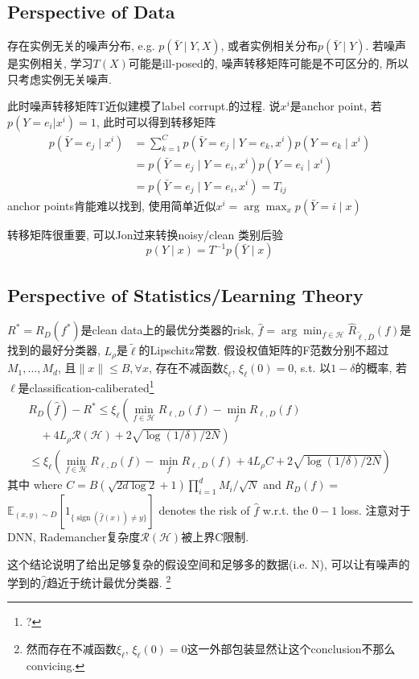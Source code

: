 \documentclass{article}
\begin{document}
\subsection{Perspective of Data}
存在实例无关的噪声分布, e.g. $p(\bar Y \mid Y, X)$, 或者实例相关分布$p(\bar Y \mid Y)$. 若噪声是实例相关, 学习$T(X)$可能是ill-posed的, 噪声转移矩阵可能是不可区分的, 所以只考虑实例无关噪声.

此时噪声转移矩阵T近似建模了label corrupt.的过程. 说$x^i$是anchor point, 若$p(Y=e_i|x^i)=1$, 此时可以得到转移矩阵
\begin{equation}
    \begin{aligned}
    p\left(\bar{Y}=e_{j} \mid x^{i}\right) &=\sum_{k=1}^{C} p\left(\bar{Y}=e_{j} \mid Y=e_{k}, x^{i}\right) p\left(Y=e_{k} \mid x^{i}\right) \\
    &=p\left(\bar{Y}=e_{j} \mid Y=e_{i}, x^{i}\right) p\left(Y=e_{i} \mid x^{i}\right) \\
    &=p\left(\bar{Y}=e_{j} \mid Y=e_{i}, x^{i}\right)=T_{i j}
    \end{aligned}
\end{equation}
anchor points肯能难以找到, 使用简单近似$x^{i}=\arg \max _{x} p(\bar{Y}=i \mid x)$

转移矩阵很重要, 可以Jon过来转换noisy/clean 类别后验
\begin{equation}
    p(Y \mid x)=T^{-1} p(\bar{Y} \mid x)
\end{equation}

\subsection{Perspective of Statistics/Learning Theory}

$R^{*}=R_{D}\left(f^{*}\right)$是clean data上的最优分类器的risk, $\hat{f}=\arg \min _{f \in \mathcal{H}} \widehat{R}_{\tilde{\ell}, \bar{D}}(f)$是找到的最好分类器, $L_\rho$是$\tilde{\ell}$的Lipschitz常数. 假设权值矩阵的F范数分别不超过$M_{1}, \ldots, M_{d}$, 且$\|x\| \le B,\forall x$, 存在不减函数$\xi_{\ell}$, $\xi_{\ell}(0)=0$, s.t.
以$1-\delta$的概率, 若$\ell$是classification-caliberated\footnote{?}
\begin{equation}
    \begin{array}{l}
    R_{D}(\hat{f})-R^{*} \leq \xi_{\ell}\left(\min _{f \in \mathcal{H}} R_{\ell, D}(f)-\min _{f} R_{\ell, D}(f)\right. \\
    \left.\quad+4 L_{\rho} \mathcal{R}(\mathcal{H})+2 \sqrt{\log (1 / \delta) / 2 N}\right) \\
    \leq \xi_{\ell}\left(\min _{f \in \mathcal{H}} R_{\ell, D}(f)-\min _{f} R_{\ell, D}(f)+4 L_{\rho} C+2 \sqrt{\log (1 / \delta) / 2 N}\right)
    \end{array}
\end{equation}
其中
where $C=B(\sqrt{2 d \log 2}+1) \prod_{i=1}^{d} M_{i} / \sqrt{N}$ 
and 
$R_{D}(f)=$
$\mathbb{E}_{(x, y) \sim D}\left[1_{\{\operatorname{sign}(\hat{f}(x)) \neq y\}}\right]$ denotes the risk of $\hat{f}$ w.r.t. the $0-1$ loss.
注意对于DNN, Rademancher复杂度$\mathcal R(\mathcal H)$被上界C限制.

\begin{remark}
    这个结论说明了给出足够复杂的假设空间和足够多的数据(i.e. N), 可以让有噪声的学到的$\hat f$趋近于统计最优分类器. \footnote{
        然而存在不减函数$\xi_{\ell}$, $\xi_{\ell}(0)=0$这一外部包装显然让这个conclusion不那么convicing.
    }
\end{remark}
\end{document}
